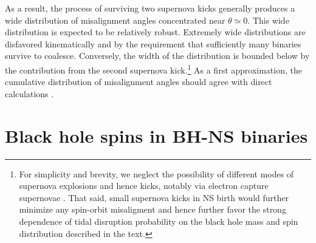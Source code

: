 \documentclass[nofootinbib,twocolumn,prd]{emulateapj}
\begin{document}
As a result, the process of surviving two supernova kicks generally produces a wide  distribution of misalignment
angles concentrated near $\theta\simeq 0$.  This wide distribution is expected to be relatively robust.  Extremely wide
distributions are disfavored kinematically and by the requirement that sufficiently many binaries survive to coalesce.
Conversely, the width of the distribution is bounded below by the contribution from the second supernova kick.\footnote{For simplicity and brevity, we neglect the
  possibility of different modes of supernova explosions and hence kicks, notably via electron capture supernovae \citep{2012ARNPS..62..407J,2004ApJ...612.1044P,2010MNRAS.406..656K,2015ApJ...801...32A}.  That said, small supernova kicks in NS
  birth would further minimize any spin-orbit misaligment and hence further favor the strong dependence of tidal disruption probability on the black hole mass and spin
  distribution described in the text.} 
As a first approximation,  the cumulative distribution of misalignment angles should agree with direct calculations \cite{2010ApJ...719L..79F,2008ApJ...682..474B,2004PhRvD..69j2002G}.





\section{Black hole spins in BH-NS binaries}
\end{document}
